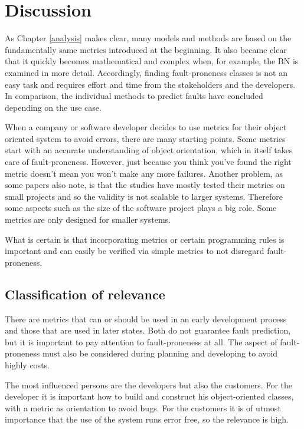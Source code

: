 \section{Discussion}\label{discussion}

As Chapter \ref{analysis} makes clear, many models and methods are based on the fundamentally same metrics introduced at the beginning. It also became clear that it quickly becomes mathematical and complex when, for example, the BN is examined in more detail. Accordingly, finding fault-proneness classes is not an easy task and requires effort and time from the stakeholders and the developers.
In comparison, the individual methods to predict faults have concluded depending on the use case.

When a company or software developer decides to use metrics for their object oriented system to avoid errors, there are many starting points. Some metrics start with an accurate understanding of object orientation, which in itself takes care of fault-proneness. However, just because you think you've found the right metric doesn't mean you won't make any more failures. Another problem, as some papers also note, is that the studies have mostly tested their metrics on small projects and so the validity is not scalable to larger systems. Therefore some aspects such as the size of the software project plays a big role. Some metrics are only designed for smaller systems.

What is certain is that incorporating metrics or certain programming rules is important and can easily be verified via simple metrics to not disregard fault-proneness.


\subsection{Classification of relevance}

There are metrics that can or should be used in an early development process and those that are used in later states. Both do not guarantee fault prediction, but it is important to pay attention to fault-proneness at all.
The aspect of fault-proneness must also be considered during planning and developing to avoid highly costs.

The most influenced persons are the developers but also the customers.
For the developer it is important how to build and construct his object-oriented classes, with a metric as orientation to avoid bugs. For the customers it is of utmost importance that the use of the system runs error free, so the relevance is high.

